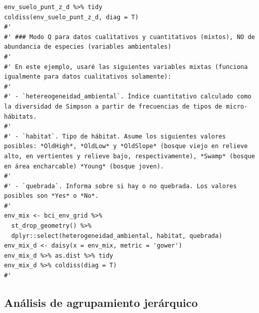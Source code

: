 \documentclass[11pt,]{article}
\begin{document}
\begin{verbatim}
env_suelo_punt_z_d %>% tidy
coldiss(env_suelo_punt_z_d, diag = T)
#'
#' ### Modo Q para datos cualitativos y cuantitativos (mixtos), NO de abundancia de especies (variables ambientales)
#' 
#' En este ejemplo, usaré las siguientes variables mixtas (funciona igualmente para datos cualitativos solamente):
#' 
#' - `hetereogeneidad_ambiental`. Índice cuantitativo calculado como la diversidad de Simpson a partir de frecuencias de tipos de micro-hábitats.
#' 
#' - `habitat`. Tipo de hábitat. Asume los siguientes valores posibles: *OldHigh*, *OldLow* y *OldSlope* (bosque viejo en relieve alto, en vertientes y relieve bajo, respectivamente), *Swamp* (bosque en área encharcable) *Young* (bosque joven).
#' 
#' - `quebrada`. Informa sobre si hay o no quebrada. Los valores posibles son *Yes* o *No*.
#' 
env_mix <- bci_env_grid %>%
  st_drop_geometry() %>%
  dplyr::select(heterogeneidad_ambiental, habitat, quebrada)
env_mix_d <- daisy(x = env_mix, metric = 'gower')
env_mix_d %>% as.dist %>% tidy
env_mix_d %>% coldiss(diag = T)
#'
\end{verbatim}

\subsection{Análisis de agrupamiento
jerárquico}\label{anuxe1lisis-de-agrupamiento-jeruxe1rquico}
\end{document}

